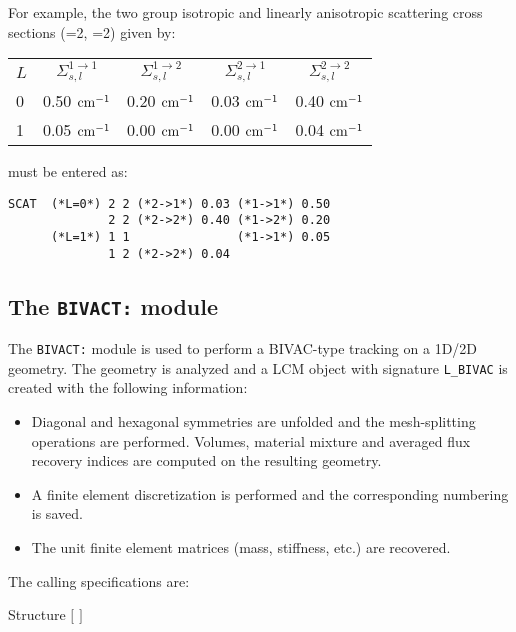 For example, the two group isotropic and linearly anisotropic scattering
cross sections (=2, =2) given by:

\begin{center}
\begin{tabular}{lcccc}
$L$ & $\Sigma_{s,l}^{1\to 1}$ & $\Sigma_{s,l}^{1\to 2}$
    & $\Sigma_{s,l}^{2\to 1}$ & $\Sigma_{s,l}^{2\to 2}$ \\
0   & 0.50 ${\rm cm}^{-1}$ & 0.20 ${\rm cm}^{-1}$ & 0.03 ${\rm cm}^{-1}$ & 0.40 ${\rm cm}^{-1}$ \\
1   & 0.05 ${\rm cm}^{-1}$ & 0.00 ${\rm cm}^{-1}$ & 0.00 ${\rm cm}^{-1}$ & 0.04 ${\rm cm}^{-1}$ 
\end{tabular}
\end{center}

\noindent must be entered as:

\begin{verbatim}
SCAT  (*L=0*) 2 2 (*2->1*) 0.03 (*1->1*) 0.50 
              2 2 (*2->2*) 0.40 (*1->2*) 0.20 
      (*L=1*) 1 1               (*1->1*) 0.05 
              1 2 (*2->2*) 0.04             
\end{verbatim}
\clearpage

\subsection{The {\tt BIVACT:} module}\label{sect:bivact}

The {\tt BIVACT:} module is used to perform  a BIVAC-type {\sc tracking} on a 1D/2D geometry.\cite{bivac,benaboud,SVAT1}
The geometry is analyzed and a LCM object with signature {\tt L\_BIVAC} is created with the following information:
\begin{itemize}
\item Diagonal and hexagonal symmetries are unfolded and the mesh-splitting operations are performed. Volumes, material mixture and averaged flux recovery indices are computed on the resulting geometry.
\item A finite element discretization is performed and the corresponding numbering is saved.
\item The unit finite element matrices (mass, stiffness, etc.) are recovered.
\end{itemize}

The calling specifications are:

\begin{DataStructure}{Structure }
 \moc{:=}  $[$  $]$   \moc{::} 
\end{DataStructure}

